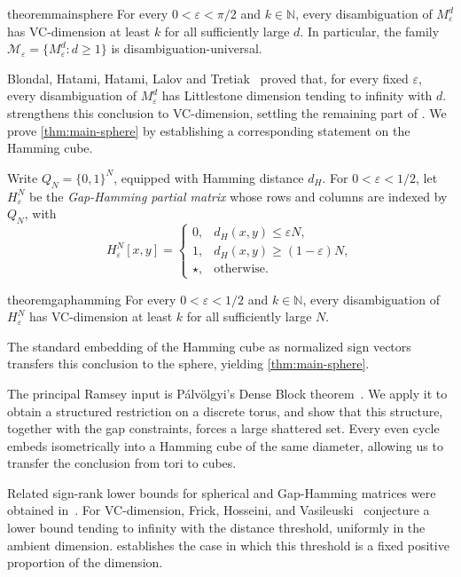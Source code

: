 \documentclass[11pt]{article}
\theoremstyle{remark}
\begin{document}
\begin{restatable}{theorem}{mainsphere}\label{thm:main-sphere}
    For every $0<\varepsilon<\pi/2$ and $k\in\mathbb N$, every disambiguation of $M_\varepsilon^d$ has VC-dimension at least $k$ for all sufficiently large $d$.
    In particular, the family $\mathcal M_\varepsilon=\{M_\varepsilon^d:d\geq1\}$ is disambiguation-universal.
\end{restatable}

Blondal, Hatami, Hatami, Lalov and Tretiak~\cite{BHHLT26} proved that, for every fixed $\varepsilon$, every disambiguation of $M_\varepsilon^d$ has Littlestone dimension tending to infinity with $d$.
 strengthens this conclusion to VC-dimension, settling the remaining part of \cite[Open Question 4]{AHHM22}.
We prove \cref{thm:main-sphere} by establishing a corresponding statement on the Hamming cube.

Write $Q_N=\{0,1\}^N$, equipped with Hamming distance $d_H$.
For $0<\varepsilon<1/2$, let $H_\varepsilon^N$ be the \emph{Gap-Hamming partial matrix} whose rows and columns are indexed by $Q_N$, with
\[
H_\varepsilon^N[x,y]=
\begin{cases}
0, & d_H(x,y)\leq\varepsilon N,\\
1, & d_H(x,y)\geq(1-\varepsilon)N,\\
\star, & \text{otherwise}.
\end{cases}
\]

\begin{restatable}{theorem}{gaphamming}\label{thm:main-cube}
    For every $0<\varepsilon<1/2$ and $k\in\mathbb N$, every disambiguation of $H_\varepsilon^N$ has VC-dimension at least $k$ for all sufficiently large $N$.
\end{restatable}

The standard embedding of the Hamming cube as normalized sign vectors transfers this conclusion to the sphere, yielding \cref{thm:main-sphere}.

The principal Ramsey input is Pálvölgyi's Dense Block theorem~\cite{Palvolgyi26}.
We apply it to obtain a structured restriction on a discrete torus, and show that this structure, together with the gap constraints, forces a large shattered set.
Every even cycle embeds isometrically into a Hamming cube of the same diameter, allowing us to transfer the conclusion from tori to cubes.

Related sign-rank lower bounds for spherical and Gap-Hamming matrices were obtained in~\cite{HHM23,FHV26}.
For VC-dimension, Frick, Hosseini, and Vasileuski~\cite[Conjecture~39]{FHV26} conjecture a lower bound tending to infinity with the distance threshold, uniformly in the ambient dimension.
 establishes the case in which this threshold is a fixed positive proportion of the dimension.
\end{document}
